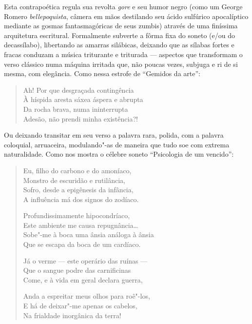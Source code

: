 \asterisc

Esta contrapoética regula sua revolta \textit{gore} e seu
humor negro (como um George Romero \textit{bellepoquista}, câmera em
mãos destilando seu ácido sulfúrico apocalíptico mediante as gosmas
fantasmagóricas de seus zumbis) através de uma finíssima arquitetura
escritural. Formalmente subverte a fôrma fixa do soneto (e/ou do
decassílabo), libertando as amarras silábicas, deixando que as sílabas
fortes e fracas conduzam a música triturante e triturada --- aspectos que
transformam o verso clássico numa máquina irritada que, não poucas
vezes, subjuga e ri de si mesma, com elegância. Como nessa estrofe de
“Gemidos da arte”:

\begin{verse}
Ah! Por que desgraçada contingência\\
À híspida aresta sáxea áspera e abrupta\\
Da rocha brava, numa ininterrupta\\
Adesão, não prendi minha existência?! 
\end{verse}

Ou deixando transitar em seu verso a palavra rara, polida, com a
palavra coloquial, arruaceira, modulando"-as de maneira que tudo soe com
extrema naturalidade. Como nos mostra o célebre soneto “Psicologia de
um vencido”: 

\begin{verse}
Eu, filho do carbono e do amoníaco,\\
Monstro de escuridão e rutilância,\\
Sofro, desde a epigênesis da infância,\\
A influência má dos signos do zodíaco.

Profundissimamente hipocondríaco,\\
Este ambiente me causa repugnância\ldots{}\\
Sobe"-me à boca uma ânsia análoga à ânsia\\
Que se escapa da boca de um cardíaco.

Já o verme --- este operário das ruínas ---\\
Que o sangue podre das carnificinas\\
Come, e à vida em geral declara guerra,

Anda a espreitar meus olhos para roê"-los,\\
E há de deixar"-me apenas os cabelos,\\
Na frialdade inorgânica da terra!
\end{verse}

